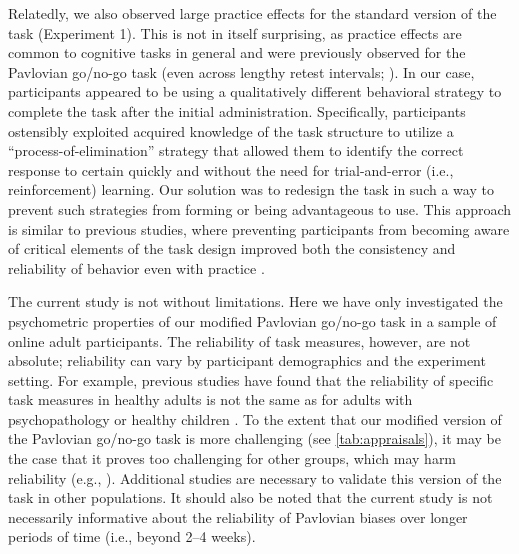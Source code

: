 \documentclass[a4paper,12pt]{article}
\begin{document}
\begin{refsection}[main]
Relatedly, we also observed large practice effects for the standard version of the task (Experiment 1). This is not in itself surprising, as practice effects are common to cognitive tasks in general \cite{hausknecht2007retesting, scharfen2018retest} and were previously observed for the Pavlovian go/no-go task (even across lengthy retest intervals; \cite{moutoussis2018change}). In our case, participants appeared to be using a qualitatively different behavioral strategy to complete the task after the initial administration. Specifically, participants ostensibly exploited acquired knowledge of the task structure to utilize a ``process-of-elimination'' strategy that allowed them to identify the correct response to certain quickly and without the need for trial-and-error (i.e., reinforcement) learning. Our solution was to redesign the task in such a way to prevent such strategies from forming or being advantageous to use. This approach is similar to previous studies, where preventing participants from becoming aware of critical elements of the task design improved both the consistency and reliability of behavior even with practice \cite{mclean2018towards}. 

The current study is not without limitations. Here we have only investigated the psychometric properties of our modified Pavlovian go/no-go task in a sample of online adult participants. The reliability of task measures, however, are not absolute; reliability can vary by participant demographics and the experiment setting. For example, previous studies have found that the reliability of specific task measures in healthy adults is not the same as for adults with psychopathology \cite{cooper2017role} or healthy children \cite{arnon2020current}. To the extent that our modified version of the Pavlovian go/no-go task is more challenging (see \ref{tab:appraisals}), it may be the case that it proves too challenging for other groups, which may harm reliability (e.g., \cite{arnon2020current}). Additional studies are necessary to validate this version of the task in other populations. It should also be noted that the current study is not necessarily informative about the reliability of Pavlovian biases over longer periods of time (i.e., beyond 2--4 weeks).


\end{refsection}
\end{document}
